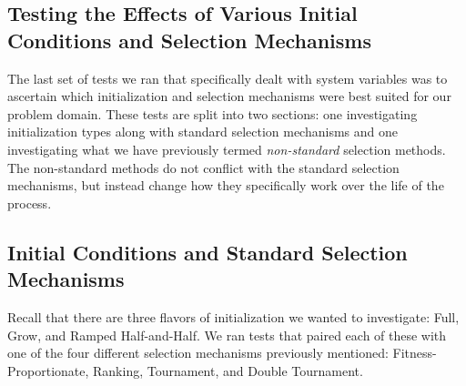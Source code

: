 \documentclass[12pt]{report} 	%
\numberwithin{figure}{chapter}
\numberwithin{table}{chapter}
\numberwithin{equation}{chapter}
\begin{document}
\begin{flushleft}
\section{Testing the Effects of Various Initial Conditions and Selection Mechanisms}
The last set of tests we ran that specifically dealt with system variables was to ascertain which initialization and selection mechanisms were best suited for our problem domain. These tests are split into two sections: one investigating initialization types along with standard selection mechanisms and one investigating what we have previously termed \textit{non-standard} selection methods. The non-standard methods do not conflict with the standard selection mechanisms, but instead change how they specifically work over the life of the process.

\subsection{Initial Conditions and Standard Selection Mechanisms}

Recall that there are three flavors of initialization we wanted to investigate: Full, Grow, and Ramped Half-and-Half. We ran tests that paired each of these with one of the four different selection mechanisms previously mentioned: Fitness-Proportionate, Ranking, Tournament, and Double Tournament.


\end{flushleft}
\end{document}

